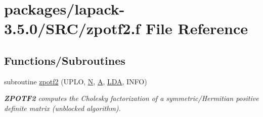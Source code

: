 \hypertarget{zpotf2_8f}{}\section{packages/lapack-\/3.5.0/\+S\+R\+C/zpotf2.f File Reference}
\label{zpotf2_8f}
\subsection*{Functions/\+Subroutines}
\begin{DoxyCompactItemize}
\item 
subroutine \hyperlink{group__complex16POcomputational_ga27ae2a5d8051eeba55cdbf16a6fffd4c}{zpotf2} (U\+P\+L\+O, \hyperlink{polmisc_8c_a0240ac851181b84ac374872dc5434ee4}{N}, \hyperlink{classA}{A}, \hyperlink{example__user_8c_ae946da542ce0db94dced19b2ecefd1aa}{L\+D\+A}, I\+N\+F\+O)
\begin{DoxyCompactList}\small\item\em {\bfseries Z\+P\+O\+T\+F2} computes the Cholesky factorization of a symmetric/\+Hermitian positive definite matrix (unblocked algorithm). \end{DoxyCompactList}\end{DoxyCompactItemize}
